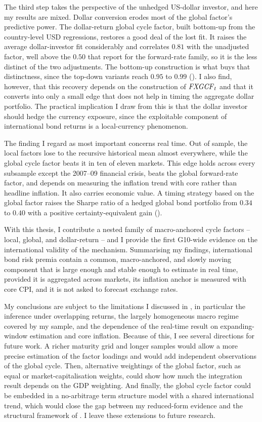 The third step takes the perspective of the unhedged US-dollar investor, and
here my results are mixed. Dollar
conversion erodes most of the global factor's predictive
power. The dollar-return global cycle factor, built bottom-up from the
country-level USD regressions, restores a good deal of the lost fit. It raises the average dollar-investor fit considerably and correlates $0.81$ with the
unadjusted factor, well above the $0.50$ that \citet{dahlquist2013} report for
the forward-rate family, so it is the less distinct of the two adjustments.
The bottom-up construction is what buys that distinctness, since the top-down
variants reach $0.95$ to $0.99$ (). I also find,
however, that this recovery depends on the construction of $\mathit{FXGCF}_{t}$ and that it
converts into only a small edge that does not help in timing the aggregate
dollar portfolio. The practical implication I
draw from this is that the dollar investor should hedge the currency
exposure, since the exploitable component of international bond returns
is a local-currency phenomenon.

The finding I regard as most important concerns real time. Out of sample,
the local factors lose to the recursive historical mean almost everywhere,
while the global cycle factor beats it in ten of eleven markets. This edge
holds across every subsample except the 2007--09 financial crisis, beats the
global forward-rate factor, and depends on measuring the inflation trend with
core rather than headline inflation. It also carries economic value. A timing strategy
based on the global factor raises the Sharpe ratio of a hedged global bond
portfolio from $0.34$ to $0.40$ with a positive certainty-equivalent gain
().

With this thesis, I contribute a nested family of macro-anchored cycle
factors -- local, global, and dollar-return -- and I provide the first
G10-wide evidence on the international validity of the \citet{cieslak2015}
mechanism. Summarising my findings, international bond
risk premia contain a common, macro-anchored, and slowly moving component
that is large enough and stable enough to estimate in real time, provided
it is aggregated across markets, its inflation anchor is measured with core
CPI, and it is not asked to forecast exchange rates.

My conclusions are subject to the limitations I discussed in
, in particular the inference under overlapping
returns, the largely homogeneous macro regime covered by my sample, and the
dependence of the real-time result on expanding-window estimation and core
inflation.
Because of this, I see several directions for future work. A richer maturity grid and longer samples would allow a more precise
estimation of the factor loadings and would add independent observations of
the global cycle. Then, alternative weightings of the global factor, such
as equal or market-capitalisation weights, could show how much the
integration result depends on the GDP weighting. And finally, the global cycle
factor could be embedded in a no-arbitrage term structure model with a
shared international trend, which would close the gap between my
reduced-form evidence and the structural framework of \citet{bauer2020}. I
leave these extensions to future research.

